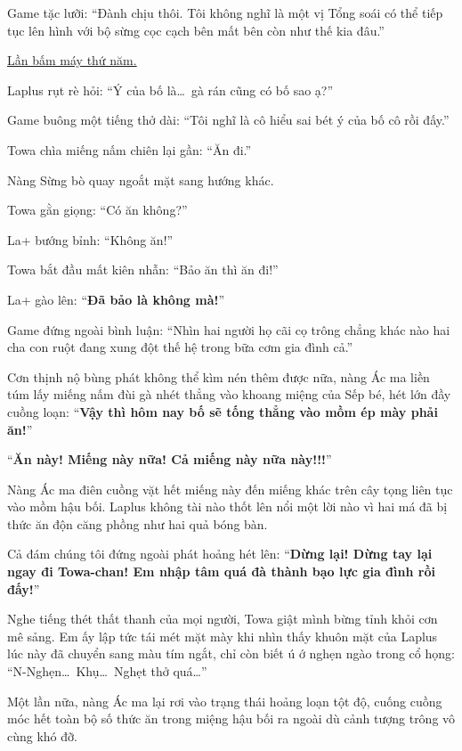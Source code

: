 \documentclass[../main.tex]{subfiles}
\begin{document}
Game tặc lưỡi: ``Đành chịu thôi. Tôi không nghĩ là một vị Tổng soái có thể tiếp tục lên hình với bộ sừng cọc cạch bên mất bên còn như thế kia đâu.''

\begin{center}
    \uline{Lần bấm máy thứ năm.}
\end{center}

Laplus rụt rè hỏi: ``Ý của bố là\dots\ gà rán cũng có bố sao ạ?''

Game buông một tiếng thở dài: ``Tôi nghĩ là cô hiểu sai bét ý của bố cô rồi đấy.''

Towa chìa miếng nấm chiên lại gần: ``Ăn đi.''

Nàng Sừng bò quay ngoắt mặt sang hướng khác.

Towa gằn giọng: ``Có ăn không?''

La+ bướng bỉnh: ``Không ăn!''

Towa bắt đầu mất kiên nhẫn: ``Bảo ăn thì ăn đi!''

La+ gào lên: ``\textbf{Đã bảo là không mà!}''

Game đứng ngoài bình luận: ``Nhìn hai người họ cãi cọ trông chẳng khác nào hai cha con ruột đang xung đột thế hệ trong bữa cơm gia đình cả.''

Cơn thịnh nộ bùng phát không thể kìm nén thêm được nữa, nàng Ác ma liền túm lấy miếng nấm đùi gà nhét thẳng vào khoang miệng của Sếp bé, hét lớn đầy cuồng loạn: ``\textbf{Vậy thì hôm nay bố sẽ tống thẳng vào mồm ép mày phải ăn!}''

``\textbf{Ăn này! Miếng này nữa! Cả miếng này nữa này!!!}''

Nàng Ác ma điên cuồng vặt hết miếng này đến miếng khác trên cây tọng liên tục vào mồm hậu bối. Laplus không tài nào thốt lên nổi một lời nào vì hai má đã bị thức ăn độn căng phồng như hai quả bóng bàn.

Cả đám chúng tôi đứng ngoài phát hoảng hét lên: ``\textbf{Dừng lại! Dừng tay lại ngay đi Towa-chan! Em nhập tâm quá đà thành bạo lực gia đình rồi đấy!}''

Nghe tiếng thét thất thanh của mọi người, Towa giật mình bừng tỉnh khỏi cơn mê sảng. Em ấy lập tức tái mét mặt mày khi nhìn thấy khuôn mặt của Laplus lúc này đã chuyển sang màu tím ngắt, chỉ còn biết ú ớ nghẹn ngào trong cổ họng: ``N-Nghẹn\dots\ Khụ\dots\ Nghẹt thở quá\dots''

Một lần nữa, nàng Ác ma lại rơi vào trạng thái hoảng loạn tột độ, cuống cuồng móc hết toàn bộ số thức ăn trong miệng hậu bối ra ngoài dù cảnh tượng trông vô cùng khó đỡ.
\end{document}

